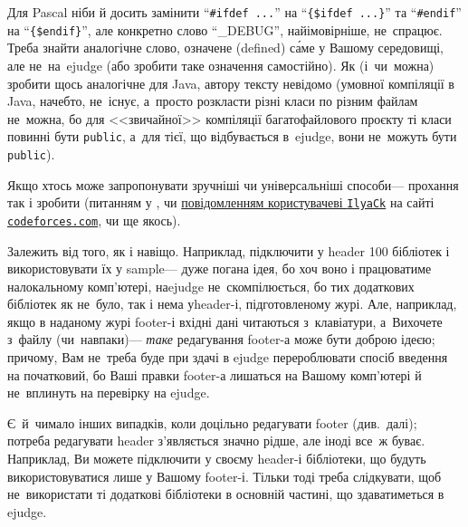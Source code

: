 Для Pascal ніби й досить замінити 
``\texttt{\#ifdef ...}''
на 
``\texttt{\{\$ifdef ...\}}''
та
``\texttt{\#endif}''
на 
``\texttt{\{\$endif\}}'',
але конкретно слово ``\_DEBUG'', найімовірніше, не~спрацює. Треба знайти аналогічне слово, означене (defined) с\'{а}ме у Вашому середовищі, але не~на~ejudge (або зробити таке означення самостійно). 
%
Як (і~чи~можна) зробити щось аналогічне для Java, автору тексту невідомо (умовної компіляції в Java, начебто, не~існує, а~просто розкласти різні класи по різним файлам не~можна, бо для <<звичайної>> компіляції багатофайлового проєкту ті класи повинні бути \texttt{public}, а~для тієї, що відбувається в~ejudge, вони не~можуть бути \texttt{public}).

Якщо хтось може запропонувати зручніші чи універсальніші способи\nolinebreak[3] --- прохання 
так і зробити
(питанням у \EjudgeCkipoName, чи \href{http://codeforces.com/usertalk?other=IlyaCk}{повідомленням користувачеві \texttt{IlyaCk}} на сайті \href{https://codeforces.com}{\texttt{codeforces.com}}, чи ще якось).

Залежить від того, як і навіщо. Наприклад, підключити у header 100 бібліотек і використовувати їх у sample\nolinebreak[3] --- дуже погана ідея, бо хоч воно і працюватиме на\nolinebreak[3] локальному комп'ютері, на\nolinebreak[2] ejudge не~скомпілюється, бо тих додаткових бібліотек як не~було, так і нема у\nolinebreak[3] \mbox{header-і}, підготовленому журі. 
Але, наприклад, якщо в наданому журі \mbox{footer-і} вхідні дані читаються з~клавіатури, а~Ви\nolinebreak[2] хочете з~файлу (чи~навпаки)\nolinebreak[3] --- \emph{таке} редагування \mbox{footer-а} може бути доброю ідеєю; причому, Вам не~треба буде при здачі в ejudge перероблювати спосіб введення на початковий, бо Ваші правки \mbox{footer-а} лишаться на Вашому комп'ютері й не~вплинуть на перевірку на ejudge.

Є~й~чимало інших випадків, коли доцільно редагувати footer (див.~далі); 
потреба редагувати header з'являється значно рідше, але іноді все~ж буває.
Наприклад, Ви можете підключити у своєму header-і бібліотеки, що будуть використовуватися лише у Вашому footer-і. Тільки тоді треба слідкувати, щоб не~використати ті додаткові бібліотеки в основній частині, що здаватиметься в ejudge.

